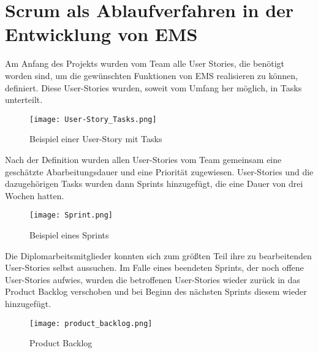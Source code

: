 \section{Scrum als Ablaufverfahren in der Entwicklung von EMS}
Am Anfang des Projekts wurden vom Team alle User Stories, die benötigt worden sind, um die gewünschten Funktionen von EMS realisieren zu können, definiert. Diese User-Stories wurden, soweit vom Umfang her möglich, in Tasks unterteilt. 
\begin{center}
\begin{figure}[H]
	\centering
	\texttt{[image: User-Story\_Tasks.png]}
	\caption{Beispiel einer User-Story mit Tasks}
\end{figure}
\end{center}
Nach der Definition wurden allen User-Stories vom Team gemeinsam eine geschätzte Abarbeitungsdauer und eine Priorität zugewiesen.  
User-Stories und die dazugehörigen Tasks wurden dann Sprints hinzugefügt, die eine Dauer von drei Wochen hatten. 
\begin{center}
\begin{figure}[H]
	\centering
	\texttt{[image: Sprint.png]}
	\caption{Beispiel eines Sprints}
\end{figure}
\end{center}
Die Diplomarbeitsmitglieder konnten sich zum größten Teil ihre zu bearbeitenden User-Stories selbst aussuchen. Im Falle eines beendeten Sprints, der noch offene User-Stories aufwies, wurden die betroffenen User-Stories wieder zurück in das Product Backlog verschoben und bei Beginn des nächsten Sprints diesem wieder hinzugefügt.
\begin{center}
\begin{figure}[H]
	\centering
	\texttt{[image: product\_backlog.png]}
	\caption{Product Backlog}
\end{figure}
\end{center}